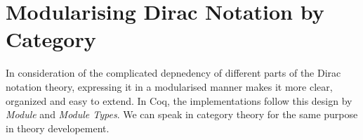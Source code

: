 \section{Modularising Dirac Notation by Category}
In consideration of the complicated depnedency of different parts of the Dirac notation theory, expressing it in a modularised manner makes it more clear, organized and easy to extend. In Coq, the implementations follow this design by \textit{Module} and \textit{Module Types}. We can speak in category theory for the same purpose in theory developement.





